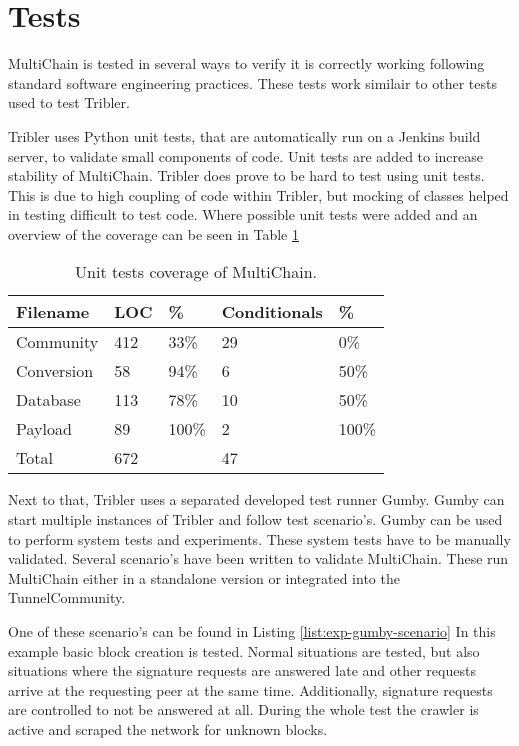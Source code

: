 \section{Tests}
MultiChain is tested in several ways to verify it is correctly working
following standard software engineering practices.
These tests work similair to other tests used to test Tribler.

Tribler uses Python unit tests, that are automatically run on a Jenkins build server\cite{jenkins}\cite{jenkins-tribler},
to validate small components of code.
Unit tests are added to increase stability of MultiChain.
Tribler does prove to be hard to test using unit tests.
This is due to high coupling of code within Tribler,
but mocking of classes helped in testing difficult to test code.
Where possible unit tests were added and an overview of the coverage can be seen in Table \ref{tab:tests}

\begin{table}
\centering
\begin{tabular}{l|ll|ll}
Filename   & LOC & \%    & Conditionals & \%    \\ \hline
Community  & 412 & 33\%  & 29           & 0\%   \\
Conversion & 58  & 94\%  & 6            & 50\%  \\
Database   & 113 & 78\%  & 10           & 50\%  \\
Payload    & 89  & 100\% & 2            & 100\% \\ \hline
Total      & 672 &       & 47           &
\end{tabular}
\caption{Unit tests coverage of MultiChain.}
\label{tab:tests}
\end{table}

Next to that, Tribler uses a separated developed test runner Gumby.
Gumby can start multiple instances of Tribler and follow test scenario's.
Gumby can be used to perform system tests and experiments.
These system tests have to be manually validated.
Several scenario's have been written to validate MultiChain.
These run MultiChain either in a standalone version or integrated into the TunnelCommunity.

One of these scenario's can be found in Listing \ref{list:exp-gumby-scenario}
In this example basic block creation is tested.
Normal situations are tested,
but also situations where the signature requests are answered late
and other requests arrive at the requesting peer at the same time.
Additionally, signature requests are controlled to not be answered at all.
During the whole test the crawler is active and scraped the network for unknown blocks.

